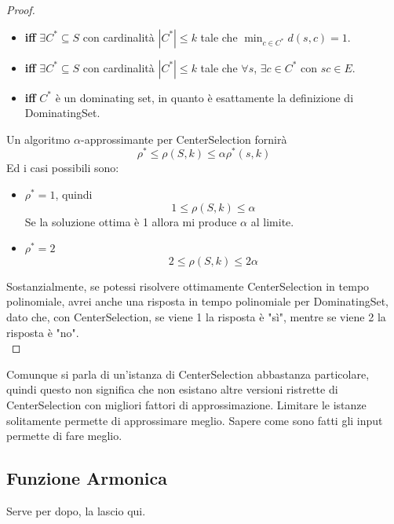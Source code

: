 \documentclass[11pt]{article}
\begin{document}
\begin{proof}
\begin{itemize}[label*=]
			\item \textbf{iff} $\exists C^\ast \subseteq S$ con cardinalità $|C^\ast| \leq k$ tale che $\min_{c \in C^\ast} d(s,c) = 1$.\\
			
			\item \textbf{iff} $\exists C^\ast \subseteq S$ con cardinalità $|C^\ast| \leq k$ tale che $\forall s$,  $\exists c \in C^\ast$ con $sc \in E$.\\
			
			\item \textbf{iff} $C^\ast$ è un dominating set, in quanto è esattamente la definizione di DominatingSet.\\
		\end{itemize}
		
		Un algoritmo $\alpha$-approssimante per CenterSelection fornirà
		$$ \rho^\ast \leq \rho (S,k) \leq \alpha \rho^\ast (s,k) $$
		Ed i casi possibili sono:
		\begin{itemize}
			\item $\rho^\ast = 1$, quindi
			$$ 1 \leq \rho(S,k) \leq \alpha $$
			Se la soluzione ottima è 1 allora mi produce $\alpha$ al limite.\\
			
			\item $\rho^\ast = 2$
			$$ 2 \leq \rho(S,k) \leq 2 \alpha $$
		\end{itemize}
		Sostanzialmente, se potessi risolvere ottimamente CenterSelection in tempo polinomiale, avrei anche una risposta in tempo polinomiale per DominatingSet, dato che, con CenterSelection, se viene 1 la risposta è "sì", mentre se viene 2 la risposta è "no".\\
	\end{proof}
	
	Comunque si parla di un'istanza di CenterSelection abbastanza particolare, quindi questo non significa che non esistano altre versioni ristrette di CenterSelection con migliori fattori di approssimazione. Limitare le istanze solitamente permette di approssimare meglio. Sapere come sono fatti gli input permette di fare meglio.\\
	
	\newpage
	
	\subsection*{Funzione Armonica}
	Serve per dopo, la lascio qui.\\
	
\end{document}
